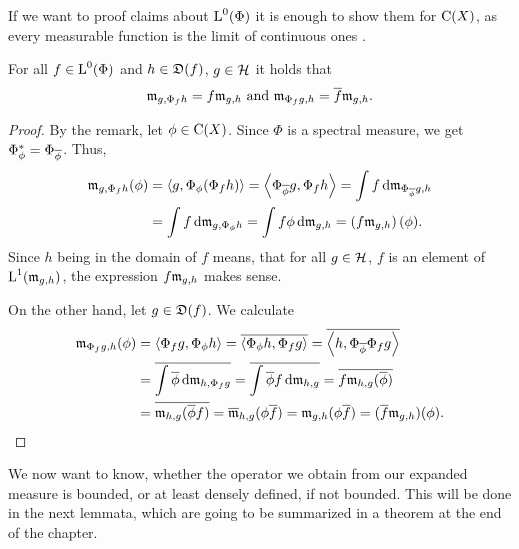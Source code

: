 \begin{rem}

If we want to proof claims about ${\text{L}^0}(\Phi)$ it is enough to show them for 
$\operatorname{C}(X)$, as every measurable function is the limit of continuous ones 
\cite[Proposition 6.2.9]{PedAnaN}.
 
\end{rem}

\begin{lem} \label{lemlinm}
 
  For all $f \in {\text{L}^0}(\Phi)$ and $h \in \mathfrak{D}(f)$, $g\in \mathcal{H}$ it holds that
 \[
 \mathfrak{m}_{g, \Phi_f h} = f\mathfrak{m}_{g,h} \text{ and } \mathfrak{m}_{\Phi_f g, h} = \overline{f}\mathfrak{m}_{g,h}.
 \]

\end{lem}

\begin{proof}
 By the remark, let $\phi \in \operatorname{C}(X)$. Since $\Phi$ is a spectral measure,
 we get $\Phi_\phi ^{*} = \Phi_{\overline{\phi}}$. Thus,
 \begin{align*}
   \mathfrak{m}_{g, \Phi_f h}(\phi) &= \left\langle g, \Phi_\phi (\Phi_f h) \right\rangle 
			  = \left\langle \Phi_{\overline{\phi}}g , \Phi_f h \right\rangle
			  = \int f \operatorname{d}\! \mathfrak{m}_{\Phi_{\overline{\phi}} g, h}\\
			  &= \int f \operatorname{d}\! \mathfrak{m}_{g, \Phi_\phi h}
			  = \int f \phi \operatorname{d}\! \mathfrak{m}_{g,h}
			  = \left( f \mathfrak{m}_{g,h} \right)(\phi).
 \end{align*}
 Since $h$ being in the domain of $f$ means, that for all $g \in \mathcal{H}$,
 $f$ is an element of $ \text{L}^1(\mathfrak{m}_{g,h})$, the expression  $f \mathfrak{m}_{g,h} $ 
 makes sense.
 
 On the other hand, let $g \in \mathfrak{D}(f)$. We calculate
 \begin{align*}
   \mathfrak{m}_{\Phi_f g , h}(\phi) &= \left\langle \Phi_f g, \Phi_\phi h \right\rangle = 
   \overline{\left\langle \Phi_\phi h, \Phi_f g \right\rangle} =
   \overline{\left\langle h, \Phi_{\overline{\phi}} \Phi_f g \right\rangle}\\
   &= \overline{\int \overline{\phi} \operatorname{d}\! \mathfrak{m}_{h, \Phi_f g}}
   = \overline{\int \overline{\phi}f \operatorname{d}\! \mathfrak{m}_{h,  g}}
   = \overline{f\mathfrak{m}_{h, g}(\overline{\phi})}\\
   &= \overline{\mathfrak{m}_{h,g}(\overline{\phi}f)}
   = \overline{\mathfrak{m}}_{h,g }(\phi \overline{f}) 
   = \mathfrak{m}_{g,h}(\phi \overline{f})
   = (\overline{f} \mathfrak{m}_{g,h})(\phi).
 \end{align*}

 
\end{proof}

We now want to know, whether the operator we obtain from our expanded measure
is bounded, or at least densely defined, if not bounded. This will be done in the next
lemmata, which are going to be summarized in a theorem at the end of the
chapter.

